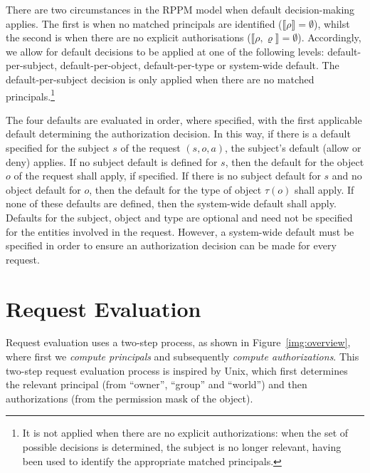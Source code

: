 \documentclass{article}
\newcommand{\semantics}[1]{\llbracket #1 \rrbracket}
\begin{document}
There are two circumstances in the RPPM model when default decision-making applies.
The first is when no matched principals are identified (\mbox{$\semantics{\rho} = \emptyset$}), whilst the second is when there are no explicit authorisations (\mbox{$\semantics{\rho,\varrho} = \emptyset$}).
Accordingly, we allow for default decisions to be applied at one of the following levels: default-per-subject, default-per-object, default-per-type or system-wide default.
The default-per-subject decision is only applied when there are no matched principals.\footnote{It is not applied when there are no explicit authorizations: when the set of possible decisions is determined, the subject is no longer  relevant, having been used to identify the appropriate matched principals.}

The four defaults are evaluated in order, where specified, with the first applicable default determining the authorization decision.
In this way, if there is a default specified for the subject $s$ of the request $(s,o,a)$, the subject's default (allow or deny) applies.
If no subject default is defined for $s$, then the default for the object $o$ of the request shall apply, if specified.
If there is no subject default for $s$ and no object default for $o$, then the default for the type of object $\tau(o)$ shall apply.
If none of these defaults are defined, then the system-wide default shall apply.
Defaults for the subject, object and type are optional and need not be specified for the entities involved in the request.
However, a system-wide default must be specified in order to ensure an authorization decision can be made for every request.

\section{Request Evaluation}\label{sec:requests}
Request evaluation uses a two-step process, as shown in Figure~\ref{img:overview}, where first we \emph{compute principals} and subsequently \emph{compute authorizations}.
This two-step request evaluation process is inspired by Unix, which first determines the relevant principal (from ``owner'', ``group'' and ``world'') and then authorizations (from the permission mask of the object).
\end{document}
